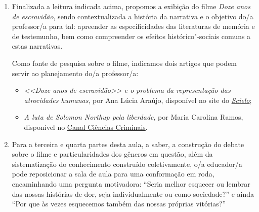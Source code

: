 \documentclass[11pt]{extarticle}
\begin{document}
\begin{enumerate}
\begin{itemize}
\item No sétimo, é importante
discutir a noção de grande prisão, bem como o ditado ``a cadeia é longa,
mas não é perpétua'', ressaltando"-se a perspectiva de \emph{mudanças
sociais} que o autor levanta. 

\item No oitavo e nono parágrafos, é importante
destacar as principais características de uma literatura memorialística
em perspectiva comparada à literatura de testemunho, ressaltando a
relevância histórica de conhecermos pontos de vista que geralmente fogem
à historiografia oficial ou reconhecida. 
\end{itemize}



\item Finalizada a leitura indicada acima, propomos a exibição do filme \emph{Doze
anos de escravidão}, sendo contextualizada a
história da narrativa e o objetivo do/a professor/a para tal: apreender
as especificidades das literaturas de memória e de testemunho, bem como
compreender os efeitos histórico"-sociais comuns a estas narrativas. 

Como
fonte de pesquisa sobre o filme, indicamos dois artigos que podem servir
ao planejamento do/a professor/a: 

\begin{itemize}
\item \emph{<<Doze anos de escravidão>> e o problema da representação das atrocidades humanas}, por Ana Lúcia Araújo, disponível no site do \href{https://www.scielo.br/scielo.php?script=sci_arttext&pid=S0002-05912014000200257}{\emph{Scielo}};

\item \emph{A luta de Solomon Northup pela liberdade}, por Maria Carolina Ramos, disponível no \href{https://canalcienciascriminais.jusbrasil.com.br/artigos/622104088/a-luta-de-solomon-northup-pela-liberdade?ref=amp}{Canal Ciências
Criminais}.
\end{itemize}

\item Para a terceira e quarta partes desta aula, a saber, a construção do
debate sobre o filme e particularidades dos gêneros em questão, além da
sistematização do conhecimento construído coletivamente, o/a educador/a
pode reposicionar a sala de aula para uma conformação em roda,
encaminhando uma pergunta motivadora: ``Seria melhor esquecer ou lembrar
das nossas histórias de dor, seja individualmente ou como sociedade?'' e
ainda ``Por que às vezes esquecemos também das nossas próprias vitórias?''


\end{enumerate}
\end{document}
